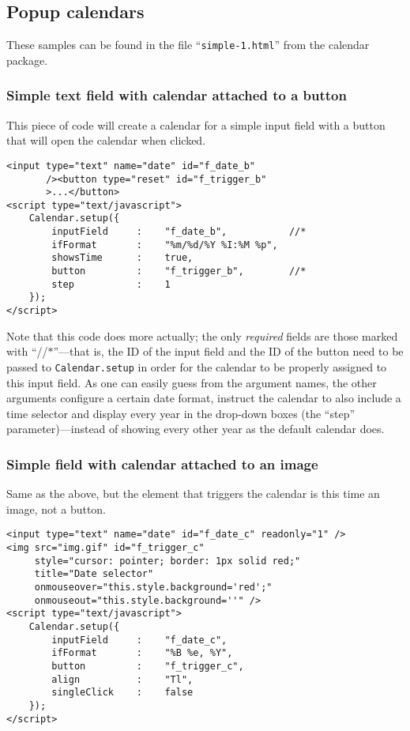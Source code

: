 \documentclass[a4paper,twoside,10pt]{dynadoc}
\begin{document}
\subsection{Popup calendars}

These samples can be found in the file “\texttt{simple-1.html}” from the
calendar package.

\subsubsection{Simple text field with calendar attached to a button}


This piece of code will create a calendar for a simple input field with a
button that will open the calendar when clicked.

\begin{verbatim}
<input type="text" name="date" id="f_date_b"
       /><button type="reset" id="f_trigger_b"
       >...</button>
<script type="text/javascript">
    Calendar.setup({
        inputField     :    "f_date_b",           //*
        ifFormat       :    "%m/%d/%Y %I:%M %p",
        showsTime      :    true,
        button         :    "f_trigger_b",        //*
        step           :    1
    });
</script>
\end{verbatim}

Note that this code does more actually; the only \emph{required} fields are
those marked with “//$*$”---that is, the ID of the input field and the ID of
the button need to be passed to \texttt{Calendar.setup} in order for the
calendar to be properly assigned to this input field.  As one can easily
guess from the argument names, the other arguments configure a certain date
format, instruct the calendar to also include a time selector and display
every year in the drop-down boxes (the “step” parameter)---instead of showing
every other year as the default calendar does.

\subsubsection{Simple field with calendar attached to an image}

Same as the above, but the element that triggers the calendar is this time
an image, not a button.

\begin{verbatim}
<input type="text" name="date" id="f_date_c" readonly="1" />
<img src="img.gif" id="f_trigger_c"
     style="cursor: pointer; border: 1px solid red;"
     title="Date selector"
     onmouseover="this.style.background='red';"
     onmouseout="this.style.background=''" />
<script type="text/javascript">
    Calendar.setup({
        inputField     :    "f_date_c",
        ifFormat       :    "%B %e, %Y",
        button         :    "f_trigger_c",
        align          :    "Tl",
        singleClick    :    false
    });
</script>
\end{verbatim}
\end{document}
